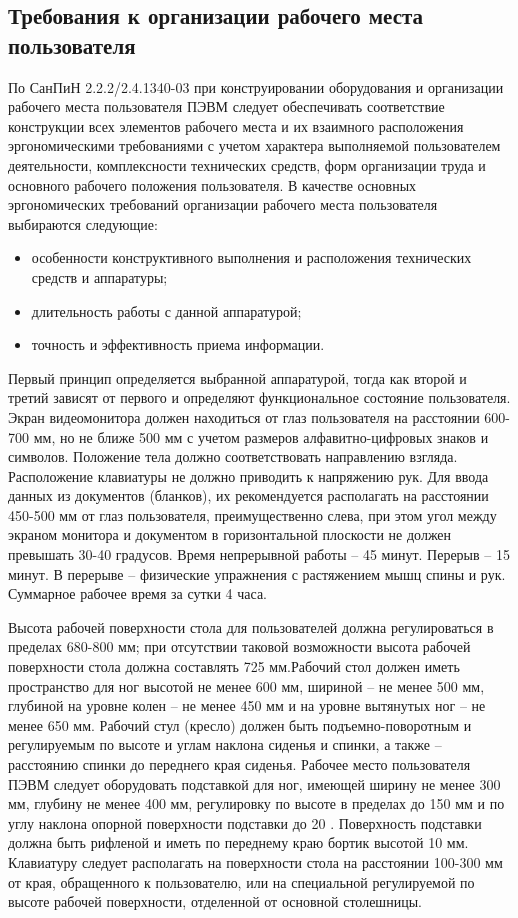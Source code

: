 \documentclass[utf8,usehyperref,12pt]{G7-32}
\begin{document}
\subsection{Требования к организации рабочего места пользователя}
По СанПиН 2.2.2/2.4.1340-03 при конструировании оборудования и организации рабочего места пользователя ПЭВМ следует обеспечивать соответствие конструкции всех элементов рабочего места и их взаимного расположения эргономическими требованиями с учетом характера выполняемой пользователем деятельности, комплексности технических средств, форм организации труда и основного рабочего положения пользователя.
В качестве основных эргономических требований организации рабочего места пользователя выбираются следующие:
\begin{itemize}
 \item особенности конструктивного выполнения и расположения технических средств и аппаратуры;
 \item длительность работы с данной аппаратурой;
 \item точность и эффективность приема информации.
\end{itemize}

Первый принцип определяется выбранной аппаратурой, тогда как второй и третий зависят от первого и определяют функциональное состояние пользователя.
Экран видеомонитора должен находиться от глаз пользователя на расстоянии 600-700 мм, но не ближе 500 мм с учетом размеров алфавитно-цифровых знаков и символов.
Положение тела должно соответствовать направлению взгляда. Расположение клавиатуры не должно приводить к напряжению рук.
Для ввода данных из документов (бланков), их рекомендуется располагать 
на расстоянии 450-500 мм от глаз пользователя, преимущественно слева, при этом угол между экраном монитора и документом в горизонтальной плоскости не должен превышать 30-40 градусов.
Время непрерывной работы – 45 минут. Перерыв – 15 минут. В перерыве – физические упражнения с растяжением мышц спины и рук. Суммарное рабочее время за сутки 4 часа.

Высота рабочей поверхности стола для пользователей должна регулироваться в пределах 680-800 мм; при отсутствии таковой возможности высота рабочей поверхности стола должна составлять 725 мм.Рабочий стол должен иметь пространство для ног высотой не менее 600 мм, шириной – не менее 500 мм, глубиной на уровне колен – не менее 450 мм и на уровне вытянутых ног – не менее 650 мм. Рабочий стул (кресло) должен быть подъемно-поворотным и регулируемым по высоте и углам наклона сиденья и спинки, а также – расстоянию спинки до переднего края сиденья.
Рабочее место пользователя ПЭВМ следует оборудовать подставкой для ног, имеющей ширину не менее 300 мм, глубину не менее 400 мм, регулировку по высоте в пределах до 150 мм и по углу наклона опорной поверхности подставки до 20 . Поверхность подставки должна быть рифленой и иметь по переднему краю бортик высотой 10 мм.
Клавиатуру следует располагать на поверхности стола на расстоянии 100-300 мм от края, обращенного к пользователю, или на специальной регулируемой по высоте рабочей поверхности, отделенной от основной столешницы.
\end{document}

